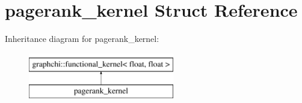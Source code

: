 \hypertarget{structpagerank__kernel}{\section{pagerank\-\_\-kernel Struct Reference}
\label{structpagerank__kernel}
}
Inheritance diagram for pagerank\-\_\-kernel\-:\begin{figure}[H]
\begin{center}
\leavevmode
\includegraphics[height=2.000000cm]{structpagerank__kernel}
\end{center}
\end{figure}
